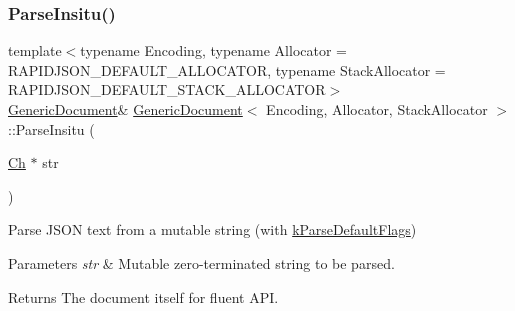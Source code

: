 \subsubsection{\texorpdfstring{Parse\+Insitu()}{ParseInsitu()}\hspace{0.1cm}{\footnotesize\ttfamily [2/2]}}
{\footnotesize\ttfamily template$<$typename Encoding, typename Allocator = R\+A\+P\+I\+D\+J\+S\+O\+N\+\_\+\+D\+E\+F\+A\+U\+L\+T\+\_\+\+A\+L\+L\+O\+C\+A\+T\+OR, typename Stack\+Allocator = R\+A\+P\+I\+D\+J\+S\+O\+N\+\_\+\+D\+E\+F\+A\+U\+L\+T\+\_\+\+S\+T\+A\+C\+K\+\_\+\+A\+L\+L\+O\+C\+A\+T\+OR$>$ \\
\hyperlink{classGenericDocument}{Generic\+Document}\& \hyperlink{classGenericDocument}{Generic\+Document}$<$ Encoding, Allocator, Stack\+Allocator $>$\+::Parse\+Insitu (\begin{DoxyParamCaption}\item[{\hyperlink{classGenericValue_ade0e0ce64ccd5d852da57a35e720bafb}{Ch} $\ast$}]{str }\end{DoxyParamCaption})\hspace{0.3cm}{\ttfamily [inline]}}



Parse J\+S\+ON text from a mutable string (with \hyperlink{reader_8h_ab7be7dabe6ffcba60fad441505583450a9104b0946d648e9467cb7a967401ec80}{k\+Parse\+Default\+Flags}) 


\begin{DoxyParams}{Parameters}
{\em str} & Mutable zero-\/terminated string to be parsed. \\
\hline
\end{DoxyParams}
\begin{DoxyReturn}{Returns}
The document itself for fluent A\+PI. 
\end{DoxyReturn}
\mbox{\label{classGenericDocument_afe94c0abc83a20f2d7dc1ba7677e6238}} 
